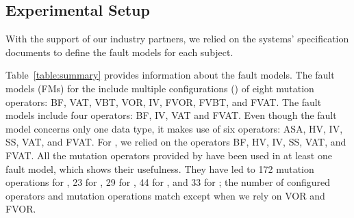 

\subsection{Experimental Setup}


With the support of our industry partners, we relied on  
 the systems' specification documents 
 to define the fault models for each subject.
 







{Table~\ref{table:summary} provides information about the fault models.}
The fault models (FMs) for the \ADCS include multiple configurations () of eight mutation operators: BF, VAT, VBT, VOR, IV, FVOR, FVBT, and FVAT.
The \PDHU fault models include four operators: BF, IV, VAT and FVAT.
Even though the \GPS fault model concerns only one data type, it makes use of six operators: ASA, HV, IV, SS, VAT, and FVAT.
For \PARAM, we relied on the operators BF, HV, IV, SS, VAT, and FVAT.
All the mutation operators provided by \APPR have been used in at least one fault model, which shows their usefulness.
{They have led to 172 mutation operations for \ADCS, 23 for \GPS, 29 for \PDHU, 44 for \PARAM, and 33 for \GCSP; the number of configured operators and mutation operations match except when we rely on VOR and FVOR.}


